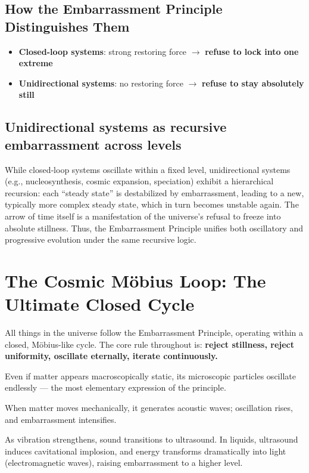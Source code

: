 \documentclass[10pt,a4paper]{article}
\begin{document}
\subsection{How the Embarrassment Principle Distinguishes Them}
\begin{itemize}[noitemsep]
\item \textbf{Closed-loop systems}: strong restoring force $\to$ \textbf{refuse to lock into one extreme}
\item \textbf{Unidirectional systems}: no restoring force $\to$ \textbf{refuse to stay absolutely still}
\end{itemize}

\subsection{Unidirectional systems as recursive embarrassment across levels}
While closed‑loop systems oscillate within a fixed level, unidirectional systems (e.g., nucleosynthesis, cosmic expansion, speciation) exhibit a hierarchical recursion: each “steady state” is destabilized by embarrassment, leading to a new, typically more complex steady state, which in turn becomes unstable again. The arrow of time itself is a manifestation of the universe’s refusal to freeze into absolute stillness. Thus, the Embarrassment Principle unifies both oscillatory and progressive evolution under the same recursive logic.

\section*{The Cosmic Möbius Loop: The Ultimate Closed Cycle}
All things in the universe follow the Embarrassment Principle,
operating within a closed, Möbius-like cycle.
The core rule throughout is:
\textbf{reject stillness, reject uniformity, oscillate eternally, iterate continuously.}

Even if matter appears macroscopically static,
its microscopic particles oscillate endlessly —
the most elementary expression of the principle.

When matter moves mechanically, it generates acoustic waves;
oscillation rises, and embarrassment intensifies.

As vibration strengthens, sound transitions to ultrasound.
In liquids, ultrasound induces cavitational implosion,
and energy transforms dramatically into light (electromagnetic waves),
raising embarrassment to a higher level.
\end{document}
